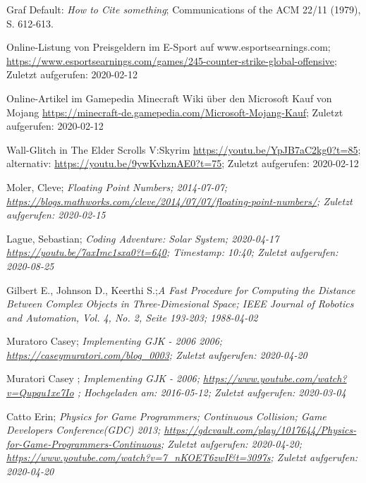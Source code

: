         Graf Default: {\sl How to Cite something}; 
        Communications of the ACM 22/11 (1979), S. 612-613.

		Online-Listung von Preisgeldern im E-Sport auf www.esportsearnings.com;
		\url{https://www.esportsearnings.com/games/245-counter-strike-global-offensive}; Zuletzt aufgerufen: 2020-02-12

		Online-Artikel im Gamepedia Minecraft Wiki über den Microsoft Kauf von Mojang
		\url{https://minecraft-de.gamepedia.com/Microsoft-Mojang-Kauf}; Zuletzt aufgerufen: 2020-02-12

		Wall-Glitch in The Elder Scrolls V:Skyrim
		\url{https://youtu.be/YpJB7aC2kg0?t=85}; 
		alternativ: \url{https://youtu.be/9ywKvhznAE0?t=75};
		Zuletzt aufgerufen: 2020-02-12

		Moler, Cleve; \sl{Floating Point Numbers}; 2014-07-07;
		\url{https://blogs.mathworks.com/cleve/2014/07/07/floating-point-numbers/};
		Zuletzt aufgerufen: 2020-02-15
		
		Lague, Sebastian; \sl{Coding Adventure: Solar System}; 2020-04-17
		\url{https://youtu.be/7axImc1sxa0?t=640};
		Timestamp: 10:40;
		Zuletzt aufgerufen: 2020-08-25

		Gilbert E., Johnson D., Keerthi S.;\sl{A Fast Procedure for Computing the Distance Between Complex Objects in Three-Dimesional Space};
		IEEE Journal of Robotics and Automation, Vol. 4, No. 2, Seite 193-203; 1988-04-02

		Muratoro Casey; \sl{Implementing GJK - 2006}
		2006;
		\url{https://caseymuratori.com/blog_0003}; Zuletzt aufgerufen: 2020-04-20

		Muratori Casey ; \sl{Implementing GJK - 2006};
		\url{https://www.youtube.com/watch?v=Qupqu1xe7Io} ; Hochgeladen am: 2016-05-12; Zuletzt aufgerufen: 2020-03-04

		Catto Erin;  \sl{Physics for Game Programmers; Continuous Collision};
		Game Developers Conference(GDC) 2013;
		\url{https://gdcvault.com/play/1017644/Physics-for-Game-Programmers-Continuous}; Zuletzt aufgerufen: 2020-04-20;
		\url{https://www.youtube.com/watch?v=7_nKOET6zwI&t=3097s}; Zuletzt aufgerufen: 2020-04-20
